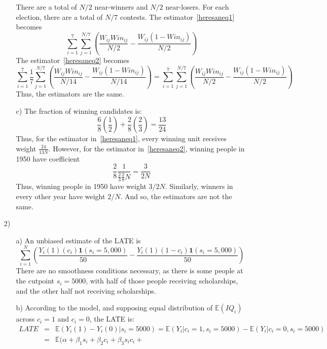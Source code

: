 \documentclass{article}
\def\E{{\mathbb E}}
\begin{document}
\begin{itemize}
\begin{itemize}
        There are a total of $N/2$ near-winners and
        $N/2$ near-losers.
        For each election, there are a total of $N/7$ contests.
        The estimator~\eqref{heresaneq1} becomes
        $$
          \sum_{i = 1}^7\sum_{j=1}^{N/7} \left(\frac{W_{ij}Win_{ij}}{N/2} 
            - \frac{W_{ij}(1-Win_{ij})}{N/2}\right)
        $$
        The estimator~\eqref{heresaneq2} becomes
        $$
          \sum_{i=1}^7 \frac{1}{7}\sum_{j=1}^{N/7} \left(
            \frac{W_{ij}Win_{ij}}{N/14} - \frac{W_{ij}(1-Win_{ij})}{N/14}
          \right) = 
          \sum_{i=1}^7 \sum_{j=1}^{N/7} \left(
            \frac{W_{ij}Win_{ij}}{N/2} - \frac{W_{ij}(1-Win_{ij})}{N/2}
          \right)
        $$
        Thus, the estimators are the same.
      \item[c)]
        The fraction of winning candidates is:
        $$
          \frac{6}{8}\left(\frac 12\right) + \frac{2}{8}\left(\frac 2 3\right) = \frac{13}{24}
        $$
        Thus, for the estimator in~\eqref{heresaneq1}, 
        every winning unit receives weight $\frac{24}{13N}$.
        However, for the estimator in~\eqref{heresaneq2},
        winning people in 1950 have coefficient
        $$
          \frac{2}{8}\frac{1}{\frac{2}{3} \frac{2}{8}N} = \frac{3}{2N}
        $$
        Thus, winning people in 1950 have
        weight $3/2N$.  
        Similarly, winners in every other year have weight
        $2/N$.
       And so, the estimators are not the same.
    \end{itemize}
  \item[2)]
    \begin{itemize}
      \item[a)]
        An unbiased estimate of the LATE is
        $$
          \sum_{i=1}^{N}\left( \frac{Y_i(1)(c_i)\mathbf 1(s_i = 5,000)}{50} - \frac{Y_i(1)(1-c_i)\mathbf 1(s_i = 5,000)}{50}\right)
        $$
        There are no smoothness conditions necessary, as there is some people at the cutpoint
        $s_i = 5000$, with half of those people receiving scholarships, and the other half not
        receiving scholarships.
      \item[b)]
        According to the model, and supposing equal distribution of
       $\E(IQ_i)$ across $c_i = 1$ and $c_i = 0$, the LATE is:
        \begin{eqnarray*}
          LATE &=& \E(Y_i(1) - Y_i(0)| s_i = 5000) = 
            \E(Y_i| c_i =1, s_i = 5000) - \E(Y_i|c_i = 0, s_i = 5000)\\
          &=& \E(\alpha + \beta_1s_i + \beta_2c_i + \beta_3 s_ic_i + 

\end{eqnarray*}
\end{itemize}
\end{itemize}
\end{document}
